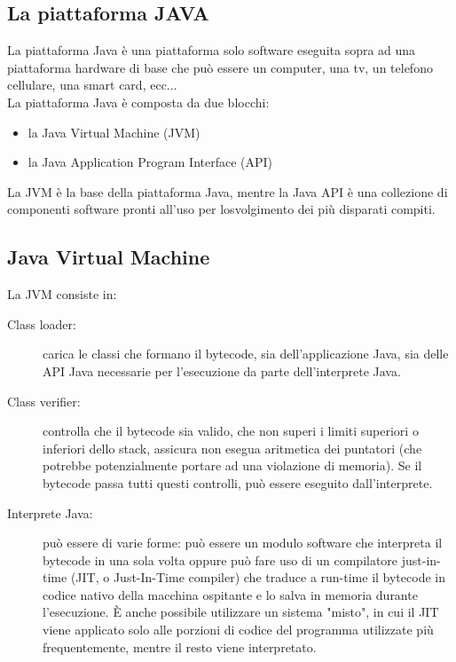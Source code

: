 \subsection{La piattaforma JAVA}
La  piattaforma  Java  \`e  una  piattaforma  solo software eseguita sopra ad  una  piattaforma hardware di base che pu\`o essere un computer, una tv, un telefono cellulare, una smart card, ecc...
\\ La piattaforma Java \`e composta da due blocchi: 
\begin{itemize}
\item la Java Virtual Machine (JVM)
\item la Java Application Program Interface (API)
\end{itemize} 
La JVM \`e  la  base  della  piattaforma  Java, mentre la Java API \`e  una  collezione  di componenti software pronti all’uso per losvolgimento dei pi\`u disparati compiti.
\subsection*{Java Virtual Machine} 
La JVM consiste in:
\begin{description}
\item [Class loader:]
carica le classi che formano il bytecode, sia dell'applicazione Java, sia delle API Java necessarie per l'esecuzione da parte dell'interprete Java.

\item [Class verifier:]
controlla che il bytecode sia valido, che non superi i limiti superiori o inferiori dello stack, assicura non esegua aritmetica dei puntatori (che potrebbe potenzialmente portare ad una violazione di memoria). Se il bytecode passa tutti questi controlli, pu\`o essere eseguito dall'interprete.

\item [Interprete Java:] 
pu\`o essere di varie forme: pu\`o essere un modulo software che interpreta il bytecode in una sola volta oppure pu\`o fare uso di un compilatore just-in-time (JIT, o Just-In-Time compiler) che traduce a run-time il bytecode in codice nativo della macchina ospitante e lo salva in memoria durante l'esecuzione. \`E anche possibile utilizzare un sistema "misto", in cui il JIT viene applicato solo alle porzioni di codice del programma utilizzate pi\`u frequentemente, mentre il resto viene interpretato.
\end{description}

